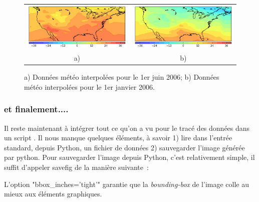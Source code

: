 \begin{figure}[htbp]
\begin{tabular}{cc}
\includegraphics[width=0.5\columnwidth]{Figs/meteo_interpolation_1.png}&
\includegraphics[width=0.5\columnwidth]{Figs/meteo_interpolation_2.png}\\
a) & b)
\end{tabular}
\caption{\label{fig:meteo_interpolation} a) Données météo interpolées pour le 1er juin 2006; b) Données météo interpolées pour le 1er janvier 2006.}
\end{figure}

\subsubsection{et finalement....}



Il reste maintenant à intégrer tout ce qu'on a vu pour le tracé des données dans un script . Il nous manque quelques éléments, à savoir 1) lire dans l'entrée standard, depuis Python, un fichier de données 2) sauvegarder l'image générée par python. Pour sauvegarder l'image depuis Python, c'est relativement simple, il suffit d'appeler savefig de la manière suivante~:
\begin{center}
\end{center}
L'option "bbox\_inches='tight'" garantie que la \emph{bounding-box} de l'image colle au mieux aux éléments graphiques.\\


\cprotect{}

